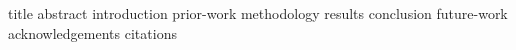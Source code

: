 \documentclass {journal}
\begin{document}
\def \JoDPagesTotal {2215}
\def \JoDPagesGoldStandard {2215}
\def \JoDCitationsTotal {11000}

 {title}
 {abstract}
 {introduction}
 {prior-work}
 {methodology}
 {results}
 {conclusion}
 {future-work}
 {acknowledgements}
 {citations}
\end{document}
